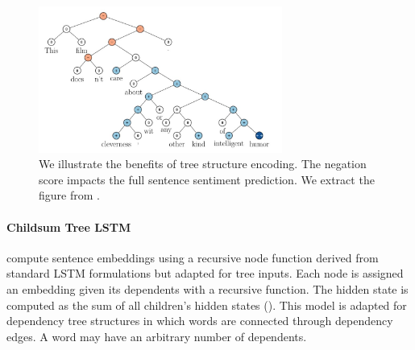 \begin{figure}[htb!]
    \centering
    \includegraphics[width=8cm]{images/socher-tree-3.png}
    \caption{We illustrate the benefits of tree structure encoding. The negation score impacts the full sentence sentiment prediction. We extract the figure from \textcite{socher_13}.}
\end{figure}


\paragraph{Childsum Tree LSTM} \textcite{tai_15} compute sentence embeddings using a recursive node function derived from standard LSTM formulations but adapted for tree inputs. Each node is assigned an embedding given its dependents with a recursive function. The hidden state is computed as the sum of all children's hidden states (). This model is adapted for dependency tree structures in which words are connected through dependency edges. A word may have an arbitrary number of dependents.


